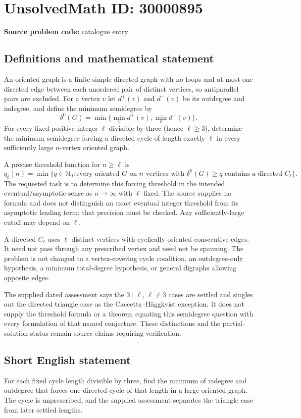 \documentclass[11pt]{article}
\newcommand{\N}{\mathbb{N}}
\begin{document}
\section*{UnsolvedMath ID: 30000895}
\textbf{Source problem code:} catalogue entry
\subsection{Definitions and mathematical statement}
An oriented graph is a finite simple directed graph with no loops and at most one directed edge between each unordered pair of distinct vertices, so antiparallel pairs are excluded. For a vertex $v$ let $d^+(v)$ and $d^-(v)$ be its outdegree and indegree, and define the minimum semidegree by
\[
 \delta^0(G)=\min\{\min_vd^+(v),\min_vd^-(v)\}.
\]
For every fixed positive integer $\ell$ divisible by three (hence $\ell\ge3$), determine the minimum semidegree forcing a directed cycle of length exactly $\ell$ in every sufficiently large $n$-vertex oriented graph.

A precise threshold function for $n\ge\ell$ is
\[
 q_\ell(n)=\min\{q\in\N_0:\text{every oriented }G\text{ on }n\text{ vertices with }
                  \delta^0(G)\ge q\text{ contains a directed }C_\ell\}.
\]
The requested task is to determine this forcing threshold in the intended eventual/asymptotic sense as $n\to\infty$ with $\ell$ fixed. The source supplies no formula and does not distinguish an exact eventual integer threshold from its asymptotic leading term; that precision must be checked. Any sufficiently-large cutoff may depend on $\ell$.

A directed $C_\ell$ uses $\ell$ distinct vertices with cyclically oriented consecutive edges. It need not pass through any prescribed vertex and need not be spanning. The problem is not changed to a vertex-covering cycle condition, an outdegree-only hypothesis, a minimum total-degree hypothesis, or general digraphs allowing opposite edges.

The supplied dated assessment says the $3\mid\ell$, $\ell\ne3$ cases are settled and singles out the directed triangle case as the Caccetta--H\"aggkvist exception. It does not supply the threshold formula or a theorem equating this semidegree question with every formulation of that named conjecture. These distinctions and the partial-solution status remain source claims requiring verification.
\subsection{Short English statement}
For each fixed cycle length divisible by three, find the minimum of indegree and outdegree that forces one directed cycle of that length in a large oriented graph. The cycle is unprescribed, and the supplied assessment separates the triangle case from later settled lengths.
\end{document}
